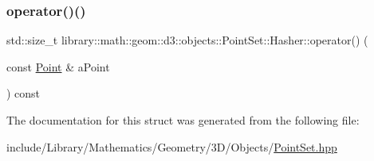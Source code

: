 \subsubsection{\texorpdfstring{operator()()}{operator()()}}
{\footnotesize\ttfamily std\+::size\+\_\+t library\+::math\+::geom\+::d3\+::objects\+::\+Point\+Set\+::\+Hasher\+::operator() (\begin{DoxyParamCaption}\item[{const \hyperlink{classlibrary_1_1math_1_1geom_1_1d3_1_1objects_1_1_point}{Point} \&}]{a\+Point }\end{DoxyParamCaption}) const\hspace{0.3cm}{\ttfamily [inline]}}



The documentation for this struct was generated from the following file\+:\begin{DoxyCompactItemize}
\item 
include/\+Library/\+Mathematics/\+Geometry/3\+D/\+Objects/\hyperlink{3_d_2_objects_2_point_set_8hpp}{Point\+Set.\+hpp}\end{DoxyCompactItemize}
